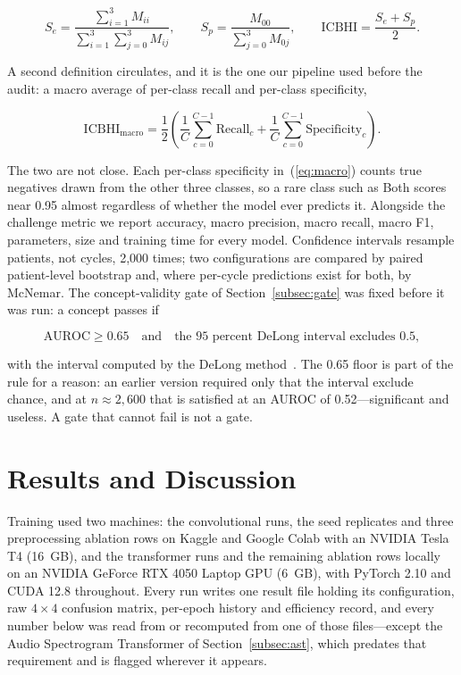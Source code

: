 \documentclass[journal,onecolumn]{IEEEtran}
\begin{document}
\begin{equation}
S_e = \frac{\sum_{i=1}^{3} M_{ii}}{\sum_{i=1}^{3}\sum_{j=0}^{3} M_{ij}},
\qquad
S_p = \frac{M_{00}}{\sum_{j=0}^{3} M_{0j}},
\qquad
\mathrm{ICBHI} = \frac{S_e + S_p}{2}.
\label{eq:official}
\end{equation}

A second definition circulates, and it is the one our pipeline used before the audit: a macro
average of per-class recall and per-class specificity,

\begin{equation}
\mathrm{ICBHI}_{\mathrm{macro}} = \frac{1}{2}\left(
\frac{1}{C}\sum_{c=0}^{C-1}\mathrm{Recall}_c +
\frac{1}{C}\sum_{c=0}^{C-1}\mathrm{Specificity}_c \right).
\label{eq:macro}
\end{equation}

The two are not close. Each per-class specificity in~(\ref{eq:macro}) counts true negatives
drawn from the other three classes, so a rare class such as Both scores near 0.95 almost
regardless of whether the model ever predicts it. Alongside the challenge metric we report
accuracy, macro precision, macro recall, macro F1, parameters, size and training time for
every model. Confidence intervals resample patients, not cycles, 2,000 times; two
configurations are compared by paired patient-level bootstrap and, where per-cycle
predictions exist for both, by McNemar. The concept-validity gate of
Section~\ref{subsec:gate} was fixed before it was run: a concept passes if

\begin{equation}
\mathrm{AUROC} \geq 0.65 \quad\text{and}\quad \text{the 95 percent DeLong interval excludes } 0.5,
\label{eq:gate}
\end{equation}

with the interval computed by the DeLong method~\cite{delong1988auc}. The 0.65 floor is part
of the rule for a reason: an earlier version required only that the interval exclude chance,
and at $n \approx 2{,}600$ that is satisfied at an AUROC of 0.52---significant and useless.
A gate that cannot fail is not a gate.

\section{Results and Discussion}
\label{sec:results}

Training used two machines: the convolutional runs, the seed replicates and three preprocessing
ablation rows on Kaggle and Google Colab with an NVIDIA Tesla T4 (16~GB), and the transformer
runs and the remaining ablation rows locally on an NVIDIA GeForce RTX 4050 Laptop GPU (6~GB),
with PyTorch 2.10 and CUDA 12.8 throughout. Every run writes one result file holding its
configuration, raw $4\times4$ confusion matrix, per-epoch history and efficiency record, and
every number below was read from or recomputed from one of those files---except the Audio
Spectrogram Transformer of Section~\ref{subsec:ast}, which predates that requirement and is
flagged wherever it appears.
\end{document}
